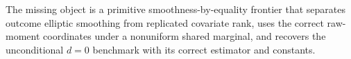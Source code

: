 The missing object is a primitive smoothness-by-equality frontier that separates outcome elliptic smoothing from replicated covariate rank, uses the correct raw-moment coordinates under a nonuniform shared marginal, and recovers the unconditional \(d=0\) benchmark with its correct estimator and constants.